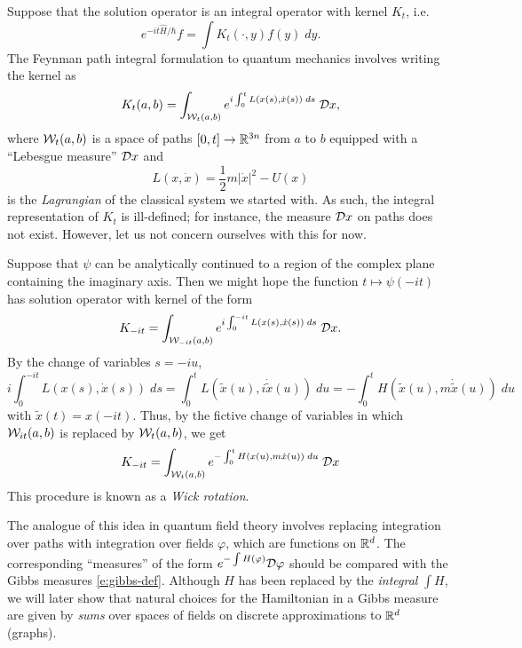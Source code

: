 Suppose that the solution operator is an integral operator with kernel $K_t$,
i.e.\
\begin{equation}
e^{-it\hat H/\hbar} f = \int K_t(\cdot, y) f(y) \; dy.
\end{equation}
The Feynman path integral formulation to quantum mechanics involves writing
the kernel as
\begin{equation}
K_t(a, b)
	=
\int_{\mathcal{W}_t(a, b)} e^{i \int_0^t L(x(s), \dot x(s)) \; ds} \; \mathcal{D} x,
\end{equation}
where $\mathcal{W}_t(a, b)$ is a space of paths $[0, t] \rightarrow {\mathbb R}^{3n}$ from
$a$ to $b$ equipped with a ``Lebesgue measure'' $\mathcal{D} x$ and
\begin{equation}
L(x, \dot x) = \frac{1}{2} m |\dot x|^2 - U(x)
\end{equation}
is the \emph{Lagrangian} of the classical system we started with.
As such, the integral representation of $K_t$ is ill-defined;
for instance, the measure $\mathcal{D} x$ on paths does not exist. However, let us
not concern ourselves with this for now.

Suppose that $\psi$ can be analytically continued to a region of the complex
plane containing the imaginary axis. Then we might hope the function
$t \mapsto \psi(-it)$ has solution operator with kernel of the form
\begin{equation}
K_{-it} = \int_{\mathcal{W}_{-it}(a, b)} e^{i \int_0^{-it} L(x(s), \dot x(s)) \; ds} \; \mathcal{D} x.
\end{equation}
By the change of variables $s = -iu$,
\begin{equation}
i \int_0^{-it} L(x(s), \dot x(s)) \; ds
	=
\int_0^t L(\tilde x(u), i \dot{\tilde x}(u)) \; du
	=
-\int_0^t H(\tilde x(u), m \dot{\tilde x}(u)) \; du
\end{equation}
with $\tilde x(t) = x(-it)$. Thus, by the fictive change of variables in which
$\mathcal{W}_{it}(a, b)$ is replaced by $\mathcal{W}_t(a, b)$, we get
\begin{equation}
K_{-it} = \int_{\mathcal{W}_t(a, b)} e^{-\int_0^t H(x(u), m\dot x(u)) \; du} \; \mathcal{D} x
\end{equation}
This procedure is known as a \emph{Wick rotation}.

The analogue of this idea in quantum field theory involves replacing integration
over paths with integration over fields $\varphi$, which are functions on ${ {{\mathbb R}}^d}$.
The corresponding ``measures'' of the form $e^{-\int H(\varphi)} \mathcal{D}\varphi$
should be compared with the Gibbs measures \eqref{e:gibbs-def}. Although $H$
has been replaced by the \emph{integral} $\int H$, we will later show that natural
choices for the Hamiltonian in a Gibbs measure are given by \emph{sums} over
spaces of fields on discrete approximations to ${ {{\mathbb R}}^d}$ (graphs).

